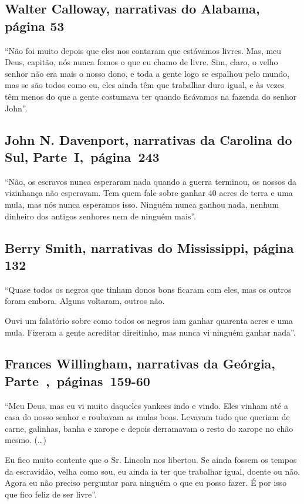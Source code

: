 \subsection{Walter Calloway, narrativas do Alabama, página 53} \label{ref43}

``Não foi muito depois que eles nos contaram que estávamos livres. Mas,
meu Deus, capitão, nós nunca fomos o que eu chamo de livre. Sim, claro,
o velho senhor não era mais o nosso dono, e toda a gente logo se
espalhou pelo mundo, mas se são todos como eu, eles ainda têm que
trabalhar duro igual, e às vezes têm menos do que a gente costumava ter
quando ficávamos na fazenda do senhor John''.

\subsection{John N. Davenport, narrativas da Carolina do Sul, Parte~I,~página~243} \label{ref67}

``Não, os escravos nunca esperaram nada quando a guerra terminou, os
nossos da vizinhança não esperavam. Tem quem fale sobre ganhar 40 acres
de terra e uma mula, mas nós nunca esperamos isso. Ninguém nunca ganhou
nada, nenhum dinheiro dos antigos senhores nem de ninguém mais''.

\subsection{Berry Smith, narrativas do Mississippi, página 132}
\label{ref242}

``Quase todos os negros que tinham donos bons ficaram com eles, mas os
outros foram embora. Alguns voltaram, outros não.

Ouvi um falatório sobre como todos os negros iam ganhar quarenta acres e
uma mula. Fizeram a gente acreditar direitinho, mas nunca vi ninguém
ganhar nada''.

\subsection{Frances Willingham, narrativas da Geórgia, Parte~,~páginas~159-60}
\label{ref297}

``Meu Deus, mas eu vi muito daqueles yankees indo e vindo. Eles vinham
até a casa do nosso senhor e roubavam as mulas boas. Levavam tudo que
queriam de carne, galinhas, banha e xarope e depois derramavam o resto
do xarope no chão mesmo. (\ldots{})

Eu fico muito contente que o Sr. Lincoln nos libertou. Se ainda fossem
os tempos da escravidão, velha como sou, eu ainda ia ter que trabalhar
igual, doente ou não. Agora eu não preciso perguntar para ninguém o que
eu posso fazer. É por isso que fico feliz de ser livre''.

